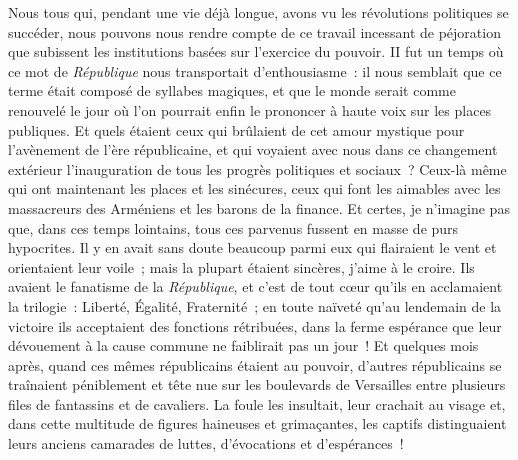 \documentclass[french,twoside]{book} %
\begin{document}
Nous tous qui, pendant une vie déjà longue, avons vu les révolutions politiques  se succéder, nous pouvons nous rendre compte de ce travail incessant de péjoration que subissent les institutions basées sur l’exercice du pouvoir. II fut un temps où ce mot de \emph{République} nous transportait d’enthousiasme : il nous semblait que ce terme était composé de syllabes magiques, et que le monde serait comme renouvelé le jour où l’on pourrait enfin le prononcer à haute voix sur les places publiques. Et quels étaient ceux qui brûlaient de cet amour mystique pour l’avènement de l’ère républicaine, et qui voyaient avec nous dans ce changement extérieur l’inauguration de tous les progrès politiques et sociaux ? Ceux-là même qui ont maintenant les places et les sinécures, ceux qui font les aimables avec les massacreurs  des Arméniens et les barons de la finance. Et certes, je n’imagine pas que, dans ces temps lointains, tous ces parvenus fussent en masse de purs hypocrites. Il y en avait sans doute beaucoup parmi eux qui flairaient le vent et orientaient leur voile ; mais la plupart étaient sincères, j’aime à le croire. Ils avaient le fanatisme de la \emph{République}, et c’est de tout cœur qu’ils en acclamaient la trilogie : Liberté, Égalité, Fraternité ; en toute naïveté qu’au lendemain de la victoire ils acceptaient des fonctions rétribuées, dans la ferme espérance que leur dévouement à la cause commune ne faiblirait pas un jour ! Et quelques mois après, quand ces mêmes républicains étaient au pouvoir, d’autres républicains se traînaient  péniblement et tête nue sur les boulevards de Versailles entre plusieurs files de fantassins et de cavaliers. La foule les insultait, leur crachait au visage et, dans cette multitude de figures haineuses et grimaçantes, les captifs distinguaient leurs anciens camarades de luttes, d’évocations et d’espérances !\par
\end{document}
